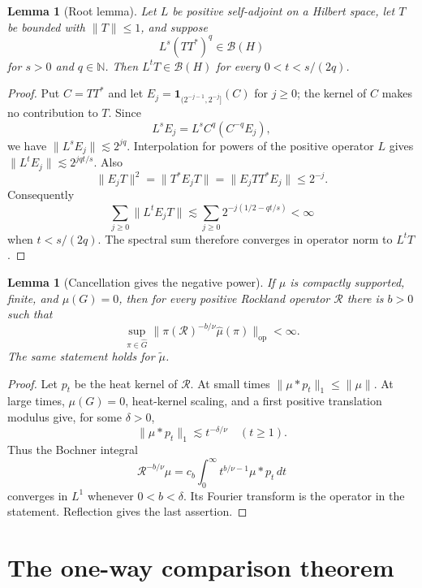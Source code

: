 \documentclass[11pt]{article}
\newtheorem{lemma}[theorem]{Lemma}
\newcommand{\Rcal}{\mathcal R}
\newcommand{\wideG}{\widehat G}
\newcommand{\op}{\mathrm{op}}
\begin{document}
\begin{lemma}[Root lemma]\label{lem:root}
Let $L$ be positive self-adjoint on a Hilbert space, let $T$ be bounded with
$\|T\|\le1$, and suppose
\[
 L^s(TT^*)^q\in\mathcal B(H)
\]
for $s>0$ and $q\in\mathbb N$.  Then $L^tT\in\mathcal B(H)$ for every
$0<t<s/(2q)$.
\end{lemma}
\begin{proof}
Put $C=TT^*$ and let
$E_j=\mathbf1_{(2^{-j-1},2^{-j}]}(C)$ for $j\ge0$; the kernel of $C$ makes
no contribution to $T$.  Since
\[
 L^sE_j=L^sC^q(C^{-q}E_j),
\]
we have $\|L^sE_j\|\lesssim2^{jq}$.  Interpolation for powers of the positive
operator $L$ gives $\|L^tE_j\|\lesssim2^{jqt/s}$.  Also
\[
 \|E_jT\|^2=\|T^*E_jT\|=\|E_jTT^*E_j\|\le2^{-j}.
\]
Consequently
\[
 \sum_{j\ge0}\|L^tE_jT\|
 \lesssim\sum_{j\ge0}2^{-j(1/2-qt/s)}<\infty
\]
when $t<s/(2q)$.  The spectral sum therefore converges in operator norm to
$L^tT$.
\end{proof}

\begin{lemma}[Cancellation gives the negative power]\label{lem:low}
If $\mu$ is compactly supported, finite, and $\mu(G)=0$, then for every
positive Rockland operator $\Rcal$ there is $b>0$ such that
\[
 \sup_{\pi\in\wideG}
 \|\pi(\Rcal)^{-b/\nu}\widehat\mu(\pi)\|_{\op}<\infty.
\]
The same statement holds for $\widetilde\mu$.
\end{lemma}
\begin{proof}
Let $p_t$ be the heat kernel of $\Rcal$.  At small times
$\|\mu*p_t\|_1\le\|\mu\|$.  At large times, $\mu(G)=0$, heat-kernel scaling,
and a first positive translation modulus give, for some $\delta>0$,
\[
 \|\mu*p_t\|_1\lesssim t^{-\delta/\nu}
 \quad(t\ge1).
\]
Thus the Bochner integral
\[
 \Rcal^{-b/\nu}\mu=
 c_b\int_0^\infty t^{b/\nu-1}\mu*p_t\,dt
\]
converges in $L^1$ whenever $0<b<\delta$.  Its Fourier transform is the
operator in the statement.  Reflection gives the last assertion.
\end{proof}

\section{The one-way comparison theorem}
\end{document}
